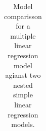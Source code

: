 \documentclass[
  letterpaper,
  DIV=11,
  numbers=noendperiod]{scrartcl}
\begin{document}
\begin{longtable}[]{@{}
  >{\centering\arraybackslash}p{}
  >{\centering\arraybackslash}p{}
  >{\centering\arraybackslash}p{}
  >{\centering\arraybackslash}p{}
  >{\centering\arraybackslash}p{}
  >{\centering\arraybackslash}p{}
  >{\centering\arraybackslash}p{}@{}}

\caption{\label{tbl-tab_comp}Model comparisson for a multiple linear
regression model agianst two nested simple linear regression models.}

\tabularnewline


\end{longtable}
\end{document}
